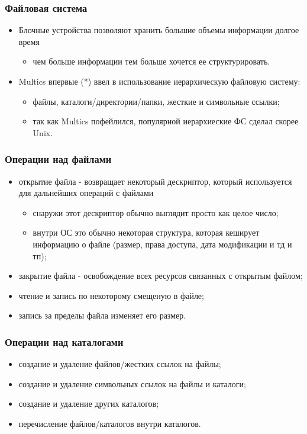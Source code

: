 \begin{frame}
\frametitle{Файловая система}
\begin{itemize}
  \item Блочные устройства позволяют хранить большие объемы информации долгое
  время
  \begin{itemize}
    \item чем больше информации тем больше хочется ее структурировать.
  \end{itemize}
  \item Multics впервые (*) ввел в использование иерархическую файловую систему:
  \begin{itemize}
    \item файлы, каталоги/директории/папки, жесткие и символьные ссылки;
    \item так как Multics пофейлился, популярной иерархиеские ФС сделал скорее
    Unix.
  \end{itemize}
\end{itemize}
\end{frame}

\begin{frame}
\frametitle{Операции над файлами}
\begin{itemize}
  \item открытие файла - возвращает некоторый дескриптор, который используется
  для дальнейших операций с файлами
  \begin{itemize}
    \item снаружи этот дескриптор обычно выглядит просто как целое число;
    \item внутри ОС это обычно некоторая структура, которая кеширует информацию
    о файле (размер, права доступа, дата модификации и тд и тп);
  \end{itemize}
  \item закрытие файла - освобождение всех ресурсов связанных с открытым
  файлом;
  \item чтение и запись по некоторому смещеную в файле;
  \item запись за пределы файла изменяет его размер.
\end{itemize}
\end{frame}

\begin{frame}
\frametitle{Операции над каталогами}
\begin{itemize}
  \item создание и удаление файлов/жестких ссылок на файлы;
  \item создание и удаление символьных ссылок на файлы и каталоги;
  \item создание и удаление других каталогов;
  \item перечисление файлов/каталогов внутри каталогов.
\end{itemize}
\end{frame}
